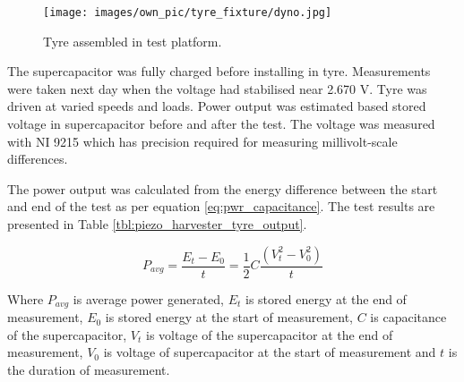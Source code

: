 \begin{figure}[htb]
\begin{center}
\texttt{[image: images/own\_pic/tyre\_fixture/dyno.jpg]}
\end{center}
\caption{\label{fig:tyre_platform} Tyre assembled in test platform.}
\end{figure}

The supercapacitor was fully charged before installing in tyre. Measurements were taken next day when the voltage had stabilised near 2.670 V. Tyre was driven at varied speeds and loads. Power output was estimated based stored voltage in supercapacitor before and after the test. The voltage was measured with NI 9215 \cite{ni9215} which has precision required for measuring millivolt-scale differences. 

The power output was calculated from the energy difference between the start and end of the test as per equation \eqref{eq:pwr_capacitance}. The test results are presented in Table \ref{tbl:piezo_harvester_tyre_output}.

\begin{equation} \label{eq:pwr_capacitance}
  P_{avg} = \frac{E_{t} - E_{0}}{t} = \frac{1}{2} C \frac{\left({V_{t}^2} - {V_{0}^2}\right)}{t}
\end{equation}

Where $P_{avg}$ is average power generated, $E_t$ is stored energy at the end of measurement, $E_0$ is stored energy at the start of measurement, $C$ is capacitance of the supercapacitor, $V_t$ is voltage of the supercapacitor at the end of measurement, $V_0$ is voltage of supercapacitor at the start of measurement and $t$ is the duration of measurement.

\begin{table}[htb]
\caption{\label{tbl:piezo_harvester_tyre_output} Measured values from tyre test setup, power is calculated with Equation \eqref{eq:pwr_capacitance}.}
\begin{center}
\end{center}
\end{table}

